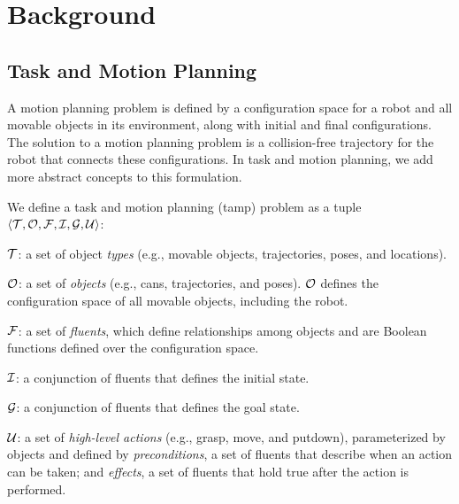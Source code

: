 \section{Background}
\subsection{Task and Motion Planning}

A motion planning problem is defined by a configuration space for a
robot and all movable objects in its environment, along with initial
and final configurations. The solution to a motion planning problem is
a collision-free trajectory for the robot that connects these
configurations.  In task and motion planning, we add more abstract
concepts to this formulation.


\begin{defn}
We define a task and motion planning ({\sc tamp}) problem as a tuple
$\langle \mathcal{T}, \mathcal{O}, \mathcal{F}, \mathcal{I}, \mathcal{G}, \mathcal{U} \rangle$:
\begin{tightlist}
\item $\mathcal{T}$: a set of object \emph{types} (e.g., movable objects,
  trajectories, poses, and locations).

\item $\mathcal{O}$: a set of \emph{objects} (e.g., cans, trajectories, and
  poses). $\mathcal{O}$ defines the configuration space of all movable
  objects, including the robot.

\item $\mathcal{F}$: a set of \emph{fluents}, which define relationships among
  objects and are Boolean functions defined over the configuration
  space.

\item $\mathcal{I}$: a conjunction of fluents that defines the initial state.

\item $\mathcal{G}$: a conjunction of fluents that defines the goal state.

\item $\mathcal{U}$: a set of \emph{high-level actions} (e.g., grasp, move, and
  putdown), parameterized by objects and defined by
  \emph{preconditions}, a set of fluents that describe when an action
  can be taken; and \emph{effects}, a set of fluents that hold true
  after the action is performed.
\end{tightlist}
\end{defn}

